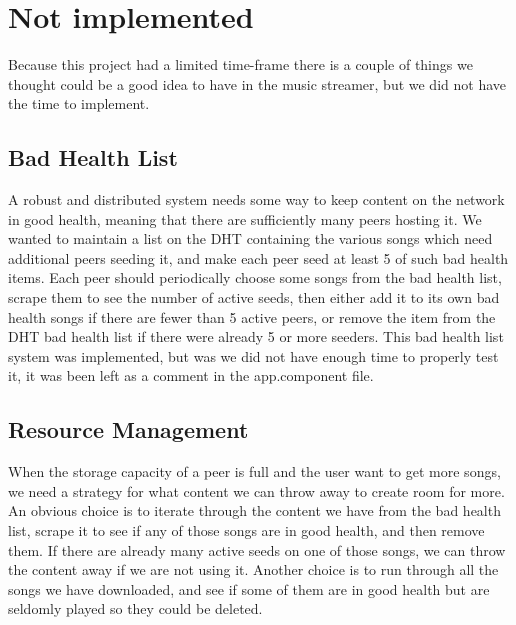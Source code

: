 

\section{Not implemented}
Because this project had a limited time-frame there is a couple of things
we thought could be a good idea to have in the
music streamer, but we did not have the time to implement.

\subsection{Bad Health List}
A robust and distributed system needs some way to keep content on the network in good health,
meaning that there are sufficiently many peers hosting it.
We wanted to maintain a list on the DHT containing the various songs which need additional peers seeding it,
and make each peer seed at least 5 of such bad health items.
Each peer should periodically choose some songs from the bad health list,
scrape them to see the number of active seeds, 
then either add it to its own bad health songs if there are fewer than 5 active peers,
or remove the item from the DHT bad health list if there were already 5 or more seeders.
This bad health list system was implemented, but was we did not have enough time to properly test it,
it was been left as a comment in the app.component file.

\subsection{Resource Management}
When the storage capacity of a peer is full and the user want to get more songs,
we need a strategy for what content we can throw away to create room for more.
An obvious choice is to iterate through the content we have from the bad health list,
scrape it to see if any of those songs are in good health,
and then remove them.
If there are already many active seeds on one of those songs,
we can throw the content away if we are not using it.
Another choice is to run through all the songs we have downloaded,
and see if some of them are in good health but are seldomly played so they could be deleted.

